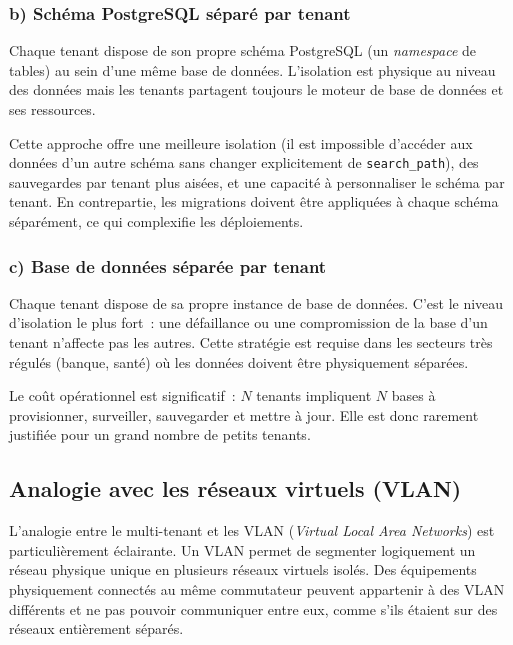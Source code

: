 \subsubsection*{b) Schéma PostgreSQL séparé par tenant}

Chaque tenant dispose de son propre schéma PostgreSQL (un \textit{namespace} de tables)
au sein d'une même base de données. L'isolation est physique au niveau des données mais
les tenants partagent toujours le moteur de base de données et ses ressources.

Cette approche offre une meilleure isolation (il est impossible d'accéder aux données d'un
autre schéma sans changer explicitement de \texttt{search\_path}), des sauvegardes par
tenant plus aisées, et une capacité à personnaliser le schéma par tenant. En contrepartie,
les migrations doivent être appliquées à chaque schéma séparément, ce qui complexifie les
déploiements.

\subsubsection*{c) Base de données séparée par tenant}

Chaque tenant dispose de sa propre instance de base de données. C'est le niveau
d'isolation le plus fort~: une défaillance ou une compromission de la base d'un tenant
n'affecte pas les autres. Cette stratégie est requise dans les secteurs très régulés
(banque, santé) où les données doivent être physiquement séparées.

Le coût opérationnel est significatif~: $N$ tenants impliquent $N$ bases à provisionner,
surveiller, sauvegarder et mettre à jour. Elle est donc rarement justifiée pour un grand
nombre de petits tenants.

\subsection{Analogie avec les réseaux virtuels (VLAN)}
\label{subsec:vlan-analogy}

L'analogie entre le multi-tenant et les VLAN (\textit{Virtual Local Area Networks}) est
particulièrement éclairante. Un VLAN permet de segmenter logiquement un réseau physique
unique en plusieurs réseaux virtuels isolés. Des équipements physiquement connectés au
même commutateur peuvent appartenir à des VLAN différents et ne pas pouvoir communiquer
entre eux, comme s'ils étaient sur des réseaux entièrement séparés.

